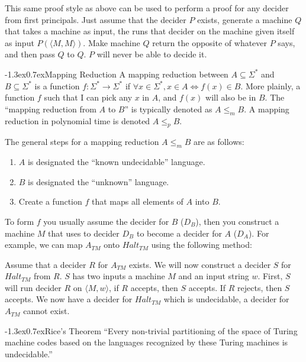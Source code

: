 \documentclass[10pt,landscape]{article}
\makeatletter
\renewcommand{\subsection}{\@startsection{subsection}{2}{0pt}%
                           {-1.3ex}{0.7ex}{\normalfont\normalsize\bfseries}}
\makeatother
\begin{document}
\begin{multicols*}{3}
This same proof style as above can be used to perform a proof for any decider
from first principals. Just assume that the decider $P$ exists, generate a
machine $Q$ that takes a machine as input, the runs that decider on
the machine given itself as input $P(\langle M, M\rangle)$. Make machine $Q$
return the opposite of whatever $P$ says, and then pass $Q$ to $Q$. $P$ will
never be able to decide it.

\subsection{Mapping Reduction}
A mapping reduction between $A \subseteq \Sigma^*$ and 
$B \subseteq \Sigma^*$ is a function $f : \Sigma^* \to \Sigma^*$ if
$\forall x \in \Sigma^*, x \in A \Leftrightarrow f(x) \in B$. More plainly,
a function $f$ such that I can pick any $x$ in $A$, and $f(x)$ will also
be in $B$. The ``mapping reduction from $A$ to $B$'' is typically denoted
as $A \leq_m B$. A mapping reduction in polynomial time is denoted
$A \leq_p B$.

The general steps for a mapping reduction $A \leq_m B$ are as follows:
\begin{enumerate}
    \item $A$ is designated the ``known undecidable'' language.
    \item $B$ is designated the ``unknown'' language.
    \item Create a function $f$ that maps all elements of $A$ into $B$.
\end{enumerate}

To form $f$ you usually assume the decider for $B$ ($D_B$), then you construct
a machine $M$ that uses to decider $D_B$ to become a decider for $A$ ($D_A$).
For example, we can map $A_{TM}$ onto $Halt_{TM}$ using the following method:

Assume that a decider $R$ for $A_{TM}$ exists. We will now construct
a decider $S$ for $Halt_{TM}$ from $R$. $S$ has two inputs a machine $M$ and
an input string $w$. First, $S$ will run decider $R$ on $\langle M, w\rangle$,
if $R$ accepts, then $S$ accepts. If $R$ rejects, then $S$ accepts. We
now have a decider for $Halt_{TM}$ which is undecidable, a decider for
$A_{TM}$ cannot exist.

\subsection{Rice's Theorem}
``Every non-trivial partitioning of the space of Turing machine 
codes based on the languages recognized by these Turing machines 
is undecidable.''


\end{multicols*}
\end{document}
